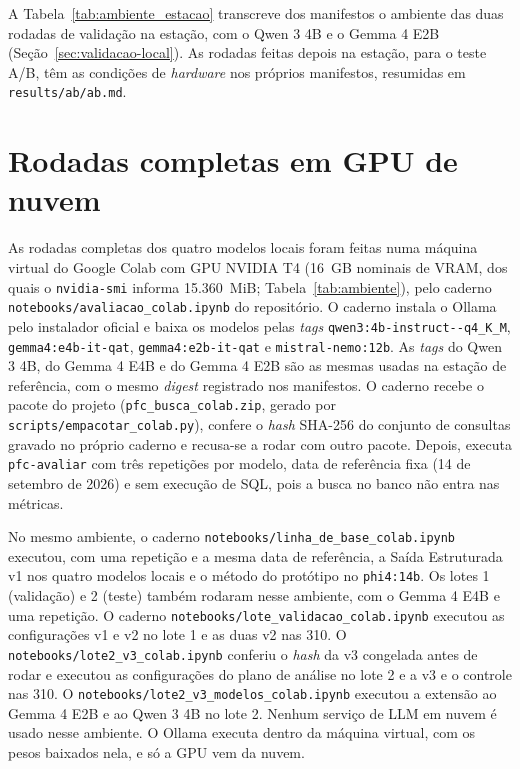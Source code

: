 A Tabela~\ref{tab:ambiente_estacao} transcreve dos manifestos o ambiente das duas rodadas de validação na estação, com o Qwen 3 4B e o Gemma 4 E2B (Seção~\ref{sec:validacao-local}). As rodadas feitas depois na estação, para o teste A/B, têm as condições de \textit{hardware} nos próprios manifestos, resumidas em \texttt{results/\allowbreak ab/\allowbreak ab.md}.


\section{Rodadas completas em GPU de nuvem}
\label{apx:specs-colab}

As rodadas completas dos quatro modelos locais foram feitas numa máquina virtual do Google Colab com GPU NVIDIA T4 (16~GB nominais de VRAM, dos quais o \texttt{nvidia-smi} informa 15.360~MiB; Tabela~\ref{tab:ambiente}), pelo caderno \texttt{notebooks/avaliacao\_colab.ipynb} do repositório. O caderno instala o Ollama pelo instalador oficial e baixa os modelos pelas \textit{tags} \texttt{qwen3:4b-instruct--q4\_K\_M}, \texttt{gemma4:\allowbreak e4b-it-qat}, \texttt{gemma4:\allowbreak e2b-it-qat} e \texttt{mistral-nemo:12b}. As \textit{tags} do Qwen 3 4B, do Gemma 4 E4B e do Gemma 4 E2B são as mesmas usadas na estação de referência, com o mesmo \textit{digest} registrado nos manifestos. O caderno recebe o pacote do projeto (\texttt{pfc\_busca\_colab.zip}, gerado por \texttt{scripts/\allowbreak empacotar\_colab.py}), confere o \textit{hash} SHA-256 do conjunto de consultas gravado no próprio caderno e recusa-se a rodar com outro pacote. Depois, executa \texttt{pfc-avaliar} com três repetições por modelo, data de referência fixa (14 de setembro de 2026) e sem execução de SQL, pois a busca no banco não entra nas métricas.

No mesmo ambiente, o caderno \texttt{notebooks/linha\_de\_base\_colab.ipynb} executou, com uma repetição e a mesma data de referência, a Saída Estruturada v1 nos quatro modelos locais e o método do protótipo no \texttt{phi4:14b}. Os lotes 1 (validação) e 2 (teste) também rodaram nesse ambiente, com o Gemma 4 E4B e uma repetição. O caderno \texttt{notebooks/\allowbreak lote\_validacao\_colab.ipynb} executou as configurações v1 e v2 no lote 1 e as duas v2 nas 310. O \texttt{notebooks/\allowbreak lote2\_v3\_colab.ipynb} conferiu o \textit{hash} da v3 congelada antes de rodar e executou as configurações do plano de análise no lote 2 e a v3 e o controle nas 310. O \texttt{notebooks/\allowbreak lote2\_v3\_modelos\_colab.ipynb} executou a extensão ao Gemma 4 E2B e ao Qwen 3 4B no lote 2. Nenhum serviço de LLM em nuvem é usado nesse ambiente. O Ollama executa dentro da máquina virtual, com os pesos baixados nela, e só a GPU vem da nuvem.

